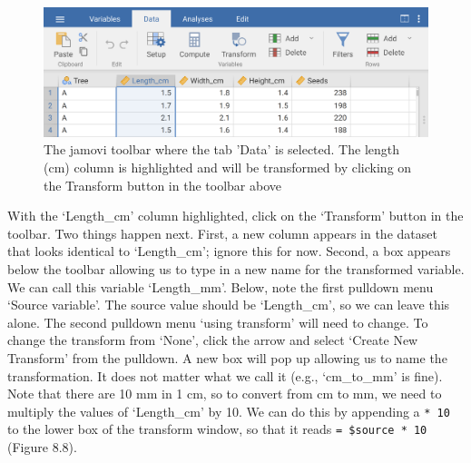 \documentclass[
]{scrbook}
\begin{document}
\begin{figure}
\includegraphics[width=1\linewidth]{img/jamovi_transform_fig_length} \caption{The jamovi toolbar where the tab 'Data' is selected. The length (cm) column is highlighted and will be transformed by clicking on the Transform button in the toolbar above}\label{fig:unnamed-chunk-30}
\end{figure}

With the `Length\_cm' column highlighted, click on the `Transform' button in the toolbar.
Two things happen next.
First, a new column appears in the dataset that looks identical to `Length\_cm'; ignore this for now.
Second, a box appears below the toolbar allowing us to type in a new name for the transformed variable.
We can call this variable `Length\_mm'.
Below, note the first pulldown menu `Source variable'.
The source value should be `Length\_cm', so we can leave this alone.
The second pulldown menu `using transform' will need to change.
To change the transform from `None', click the arrow and select `Create New Transform' from the pulldown.
A new box will pop up allowing us to name the transformation.
It does not matter what we call it (e.g., `cm\_to\_mm' is fine).
Note that there are 10 mm in 1 cm, so to convert from cm to mm, we need to multiply the values of `Length\_cm' by 10.
We can do this by appending a \texttt{*\ 10} to the lower box of the transform window, so that it reads \texttt{=\ \$source\ *\ 10} (Figure 8.8).
\end{document}
